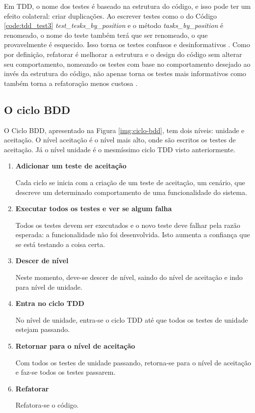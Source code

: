 Em TDD, o nome dos testes é baseado na estrutura do código, e isso pode ter um efeito colateral: criar duplicações. Ao escrever testes como o do Código \ref{code:tdd_test3} \textit{test\_tesks\_by\_position} e o método \textit{tasks\_by\_position} é renomeado, o nome do teste também terá que ser renomeado, o que provavelmente é esquecido. Isso torna os testes confusos e desinformativos \cite{ContinuousTesting}. Como por definição, refatorar é melhorar a estrutura e o design do código sem alterar seu comportamento, nomeando os testes com base no comportamento desejado ao invés da estrutura do código, não apenas torna os testes mais informativos como também torna a refatoração menos custosa \cite{ContinuousTesting}.


\subsection{O ciclo BDD}
\label{sub:o_ciclo_bdd}

O Ciclo BDD, apresentado na Figura \ref{img:ciclo-bdd}, tem dois níveis: unidade e aceitação. O nível aceitação é o nível mais alto, onde são escritos os testes de aceitação. Já o nível unidade é o mesmíssimo ciclo TDD visto anteriormente.

\begin{enumerate}
\item \textbf{Adicionar um teste de aceitação}

Cada ciclo se inicia com a criação de um teste de aceitação, um cenário, que descreve um determinado comportamento de uma funcionalidade do sistema.

\item \textbf{Executar todos os testes e ver se algum falha}

Todos os testes devem ser executados e o novo teste deve falhar pela razão esperada: a funcionalidade não foi desenvolvida. Isto aumenta a confiança que se está testando a coisa certa.

\item \textbf{Descer de nível}

Neste momento, deve-se descer de nível, saindo do nível de aceitação e indo para  nível de unidade.

\item \textbf{Entra no ciclo TDD}

No nível de unidade, entra-se o ciclo TDD até que todos os testes de unidade estejam passando.

\item \textbf{Retornar para o nível de aceitação}

Com todos os testes de unidade passando, retorna-se para o nível de aceitação e faz-se todos os testes passarem.

\item \textbf{Refatorar}

Refatora-se o código.

\end{enumerate}

